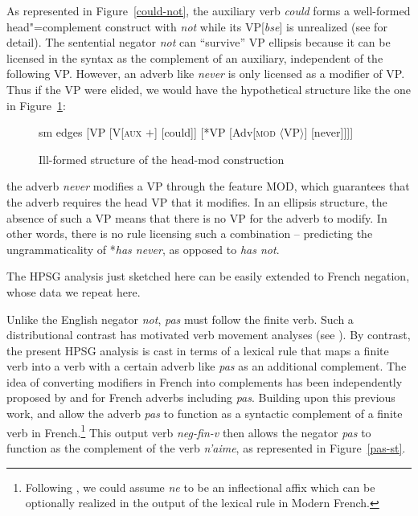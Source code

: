 \documentclass[output=paper
                ,modfonts
                		,nonflat
	        ,collection
	        ,collectionchapter
	        ,collectiontoclongg
 	        ,biblatex
                ,babelshorthands
                ,newtxmath
                ,draftmode
                ,colorlinks, citecolor=brown
]{./langsci/langscibook}
\begin{document}
{\begin{exe}
\begin{xlist}
\begin{exe}
\begin{xlist}
As represented in Figure~\ref{could-not}, the auxiliary verb \textit{could} forms a well-formed head"=complement construct with \textit{not} while its
VP[\textit{bse}] is unrealized (see \citealt{Kim:00, KS:08} for
detail). The sentential negator \textit{not} can ``survive'' VP ellipsis because it can be
licensed in the syntax as the complement of an auxiliary, independent
of the following VP.  However, an adverb like \textit{never} is only
licensed as a modifier of VP. Thus if the VP were elided, we would have the hypothetical
structure like the one in Figure~\ref{fig-could-never}:
\begin{figure}
	\begin{forest}
		sm edges
		[VP
			[V{[\textsc{aux $+$}]}
				[could]]
			[*VP
				[Adv{[\textsc{mod} $\langle$VP$\rangle$]}
					[never]]]]
	\end{forest}
\caption{Ill-formed structure of the head-mod construction}\label{fig-could-never}
\end{figure}
the adverb \textit{never} modifies a VP through the feature \textsc{MOD},
which guarantees that the adverb requires the head VP that it
modifies. In an ellipsis structure, the absence of such a VP means
that there is no VP for the adverb to modify.  In other words, there
is no rule licensing such a combination -- predicting the
ungrammaticality of *\textit{has never},  as opposed to \textit{has not}.


The HPSG analysis just sketched here can be easily extended to French negation, whose
data we repeat here.

\eal
{}
\zl

\noindent
Unlike the English negator \textit{not}, \textit{pas} must follow the
finite verb. Such a distributional contrast has motivated verb
movement analyses (see \citealt{Pollock:89,Zanuttini:01}).
By contrast, the present HPSG analysis is cast
in terms of a lexical rule that maps a finite verb into a verb
with a certain adverb like \textit{pas} as an additional complement.
 The idea of converting modifiers in French into
complements has been independently proposed by \citet{Miller92d-u} and
\citet{AG:94} for French adverbs including
\textit{pas}.  Building upon this
previous work, \citet{AG:97} and \citet{Kim:00}
allow the adverb \textit{pas} to function
as a syntactic complement of a finite verb in French.\footnote{Following \citet{AG:94}, we could assume \textit{ne} to
be an inflectional affix which can be optionally realized
in the output of the lexical rule in Modern French.}
This output verb \textit{neg-fin-v} then allows the negator \textit{pas} to function
as the complement of the verb \textit{n'aime}, as represented in Figure~\ref{pas-st}.


\end{xlist}
\end{exe}
\end{xlist}
\end{exe}}
\end{document}

